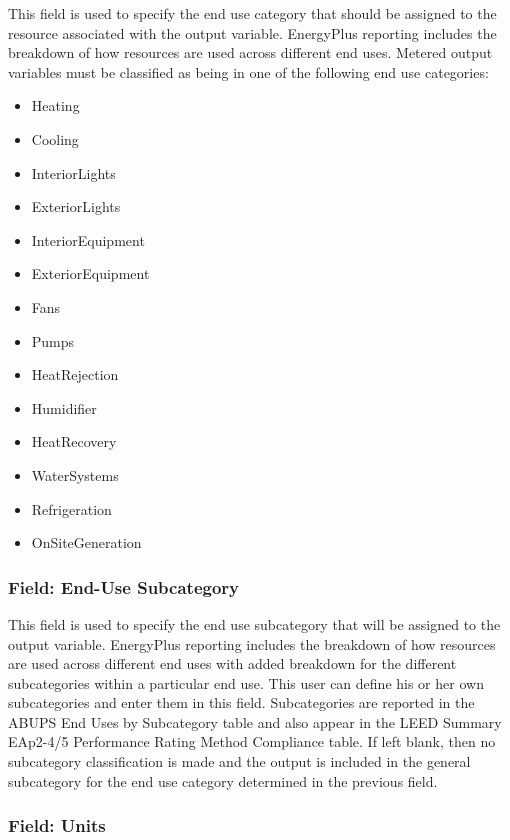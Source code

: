This field is used to specify the end use category that should be assigned to the resource associated with the output variable. EnergyPlus reporting includes the breakdown of how resources are used across different end uses. Metered output variables must be classified as being in one of the following end use categories:

\begin{itemize}
\item
  Heating
\item
  Cooling
\item
  InteriorLights
\item
  ExteriorLights
\item
  InteriorEquipment
\item
  ExteriorEquipment
\item
  Fans
\item
  Pumps
\item
  HeatRejection
\item
  Humidifier
\item
  HeatRecovery
\item
  WaterSystems
\item
  Refrigeration
\item
  OnSiteGeneration
\end{itemize}

\subsubsection{Field: End-Use Subcategory}\label{field-end-use-subcategory}

This field is used to specify the end use subcategory that will be assigned to the output variable. EnergyPlus reporting includes the breakdown of how resources are used across different end uses with added breakdown for the different subcategories within a particular end use. This user can define his or her own subcategories and enter them in this field. Subcategories are reported in the ABUPS End Uses by Subcategory table and also appear in the LEED Summary EAp2-4/5 Performance Rating Method Compliance table. If left blank, then no subcategory classification is made and the output is included in the general subcategory for the end use category determined in the previous field.

\subsubsection{Field: Units}\label{field-units-1}

